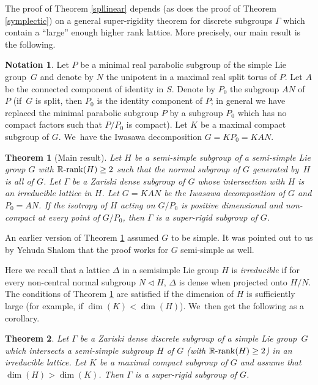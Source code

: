 \documentclass[JEP,XML,SOM,Unicode,published]{cedram}
\newcommand{\Rrank}{\R\textup{-}\rank}
\newtheorem{theorem}{Theorem}
\theoremstyle{definition}
\newtheorem{notation}{Notation}
\newcommand{\field}[1]{\mathbb{#1}}
\newcommand{\R}{\field{R}}
\newcommand{\rank}{{\operatorname{rank}}}
\begin{document}
The proof of Theorem \ref{spllinear} depends (as does the proof of Theorem \ref{symplectic}) on a general super-rigidity theorem for discrete subgroups $\Gamma$ which contain a ``large'' enough higher
rank lattice. More precisely, our main result is the following.

\begin{notation}\label{notation:Lie} Let $P$ be a minimal real parabolic subgroup of the simple Lie group~$G$ and denote by $N$ the unipotent in a maximal real split torus of $P$. Let $A$ be the connected component of identity in $S$. Denote by $P_0$ the subgroup $AN$ of $P$ (if~$G$ is split, then $P_0$ is the identity component of $P$; in general we have replaced the minimal parabolic subgroup $P$ by a subgroup $P_0$ which has no compact factors such that $P/P_0$ is compact). Let $K$ be a maximal compact subgroup of $G$. We~have the Iwasawa decomposition $G=KP_0=KAN$.
\end{notation}

\begin{theorem}[Main result]\label{theo:main}
Let $H$ be a semi-simple subgroup of a semi-simple Lie group $G$ with $\Rrank(H)\geq 2$ such that the normal subgroup of $G$ generated by~$H$ is all of $G$. Let $\Gamma $ be a Zariski dense subgroup of $G$ whose intersection with
$H$ is an irreducible lattice in $H$. Let $G=KAN$ be the Iwasawa
decomposition of $G$ and $P_0=AN$. If the isotropy of $H$ acting on $G/P_0$ is positive dimensional and non-compact at every point of $G/P_0$, then $\Gamma $ is a super-rigid subgroup of $G$.
\end{theorem}

An earlier version of Theorem \ref{theo:main} assumed $G$ to be simple. It was pointed out to us by Yehuda Shalom that the proof works for $G$ semi-simple as well.

Here we recall that a lattice $\Delta$ in a semisimple Lie group $H$ is \emph{irreducible} if for every non-central normal subgroup $N\lhd H$, $\Delta$ is dense when projected onto $H/N$. The conditions of Theorem \ref{theo:main} are satisfied if the dimension of $H$ is sufficiently large (for example, if $\dim (K)<\dim (H)$). We~then get the following as a corollary.

\begin{theorem} \label{ranktwo} Let $\Gamma $ be a Zariski dense discrete subgroup of a simple Lie group~$G$ which intersects a semi-simple subgroup $H$ of $G$ (with $\Rrank(H)\geq 2$) in an irreducible lattice. Let $K$ be a maximal compact subgroup of $G$ and assume that $\dim (H)> \dim (K)$. Then $\Gamma$ is a super-rigid subgroup of $G$.
\end{theorem}
\end{document}
